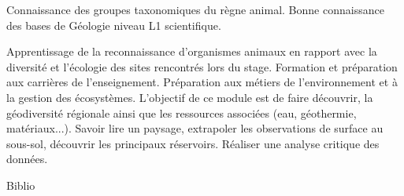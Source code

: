 \documentclass[10pt, a5paper]{report}
\begin{document}
{Connaissance des groupes taxonomiques du règne animal. Bonne connaissance des bases de Géologie niveau L1 scientifique.
} 
{\begin{itemize} 
  \ObjItem Apprentissage de la reconnaissance d’organismes animaux en rapport avec la diversité et l’écologie des sites
rencontrés lors du stage. Formation et préparation aux carrières de l’enseignement. Préparation aux métiers de l’environnement
et à la gestion des écosystèmes.
\ObjItem L’objectif de ce module est de faire découvrir, la géodiversité régionale ainsi que les ressources associées (eau, géothermie, matériaux...). Savoir lire un paysage, extrapoler les observations de surface au sous-sol, découvrir les principaux réservoirs. Réaliser une analyse critique des données.
\end{itemize} 
} 
{} 
{Biblio}
 
\vfill
\end{document}
